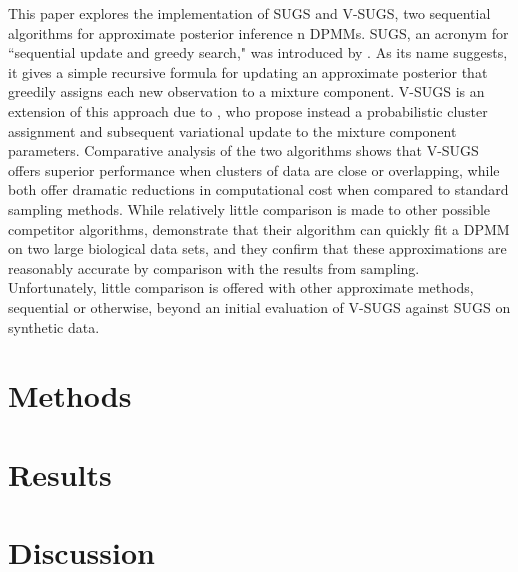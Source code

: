\documentclass{uwstat572}
\begin{document}
This paper explores the implementation of SUGS and V-SUGS, two sequential algorithms for approximate posterior inference n DPMMs. SUGS, an acronym for ``sequential update and greedy search," was introduced by \citet{wang}. As its name suggests, it gives a simple recursive formula for updating an approximate posterior that greedily assigns each new observation to a mixture component. V-SUGS is an extension of this approach due to \citet{zhang}, who propose instead a probabilistic cluster assignment and subsequent variational update to the mixture component parameters. Comparative analysis of the two algorithms shows that V-SUGS offers superior performance when clusters of data are close or overlapping, while both offer dramatic reductions in computational cost when compared to standard sampling methods. While relatively little comparison is made to other possible competitor algorithms, \citet{zhang} demonstrate that their algorithm can quickly fit a DPMM on two large biological data sets, and they confirm that these approximations are reasonably accurate by comparison with the results from sampling. Unfortunately, little comparison is offered with other approximate methods, sequential or otherwise, beyond an initial evaluation of V-SUGS against SUGS on synthetic data.

\section{Methods}

\section{Results}

\section{Discussion}


\end{document}
